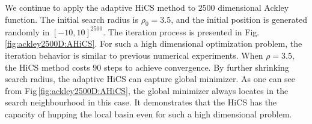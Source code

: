 %
We continue to apply the adaptive HiCS method to $2500$ dimensional
Ackley function. The initial search radius is $\rho_0=3.5$, and
the initial position is generated randomly in $[-10,10]^{2500}$. 
The iteration process is presented in Fig.\,\ref{fig:ackley2500D:AHiCS}. 
For such a high dimensional optimization problem, the iteration
behavior is similar to previous numerical experiments. 
When $\rho=3.5$, the HiCS method costs $90$ steps to achieve convergence.
By further shrinking search radius, the adaptive HiCS can
capture global minimizer. As one can see from 
Fig\,\ref{fig:ackley2500D:AHiCS}, the global minimizer always
locates in the search neighbourhood in this case. 
It demonstrates that the HiCS has the capacity of hupping the
local basin even for such a high dimensional problem.
